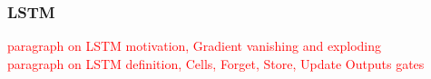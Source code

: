 \documentclass[12pt]{report}
\begin{document}


\newpage

\subsubsection{LSTM }



\textcolor{red}{paragraph on LSTM motivation, Gradient vanishing and exploding }\\






\textcolor{red}{paragraph on LSTM definition, Cells,  Forget, Store, Update Outputs gates}\\
\end{document}

